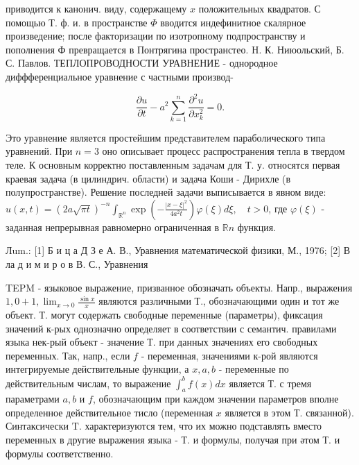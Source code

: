 \documentclass[10pt]{article}
\begin{document}
приводится к канонич. виду, содержащему $x$ положительных квадратов. С помощью Т. ф. и. в пространстве $\Phi$ вводится индефинитное скалярное произведение; после факторизации по изотропному подпространству и пополнения Ф превращается в Понтрягина пространстео. H. К. Ниюольский, Б. С. Павлов. ТЕПЛОПРОВОДНОСТИ УРАВНЕНИЕ - однородное диффференциальное уравнение с частными производ-



\[

\frac{\partial u}{\partial t}-a^{2} \sum_{k=1}^{n} \frac{\partial^{2} u}{\partial x_{k}^{2}}=0 .

\]



Это уравнение является простейшим представителем параболического типа уравнений. При $n=3$ оно описывает процесс распространения тепла в твердом теле. К основным корректно поставленным задачам для Т. у. относятся первая краевая задача (в цилиндрич. области) и задача Коши - Дирихле (в полупространстве). Решение последней задачи выписывается в явном виде: $u(x, t)=(2 a \sqrt{\pi t})^{-n} \int_{\mathbb{R}^{n}} \exp \left(-\frac{|x-\xi|^{2}}{4 a^{2} t}\right) \varphi(\xi) d \xi, \quad t>0$, где $\varphi(\xi)$ - заданная непрерывная равномерно ограниченная в $\mathbb{R} n$ функция.



Лum.: [1] Б и ц а Д З е А. В., Уравнения математической физики, М., 1976; [2] В ла д и м и р о в В. С., Уравнения



TEPM - языковое выражение, призванное обозначать объекты. Напр., выражения $1,0+1, \lim _{x \rightarrow 0} \frac{\sin x}{x}$ являются различными Т., обозначающими один и тот же объект. Т. могут содержать свободные переменные (параметры), фиксация значений к-рых однозначно определяет в соответствии с семантич. правилами языка нек-рый объект - значение Т. при данных значениях его свободных переменных. Так, напр., если $f$ - переменная, значениями к-рой являются интегрируемые действительные функции, а $x, a, b$ - переменные по действительным числам, то выражение $\int_{a}^{b} f(x) d x$ является Т. с тремя параметрами $a, b$ и $f$, обозначающим при каждом значении параметров вполне определенное действительное тисло (переменная $x$ является в этом Т. связанной). Синтаксически $\mathrm{T}$. характеризуются тем, что их можно подставлять вместо переменных в другие выражения языка - Т. и формулы, получая при әтом Т. и формулы соответственно.
\end{document}

